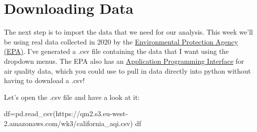 \documentclass[
  letterpaper,
  DIV=11,
  numbers=noendperiod]{scrreprt}
\newenvironment{Shaded}{\begin{snugshade}}{\end{snugshade}}
\newcommand{\NormalTok}[1]{\textcolor[rgb]{0.00,0.23,0.31}{#1}}
\newcommand{\OperatorTok}[1]{\textcolor[rgb]{0.37,0.37,0.37}{#1}}
\newcommand{\StringTok}[1]{\textcolor[rgb]{0.13,0.47,0.30}{#1}}
\begin{document}
\hypertarget{downloading-data-1}{%
\section{Downloading Data}\label{downloading-data-1}}

The next step is to import the data that we need for our analysis. This
week we'll be using real data collected in 2020 by the
\href{https://www.epa.gov/outdoor-air-quality-data/download-daily-data}{Environmental
Protection Agency (EPA)}. I've generated a .csv file containing the data
that I want using the dropdown menus. The EPA also has an
\href{https://aqs.epa.gov/aqsweb/documents/data_api.html}{Application
Programming Interface} for air quality data, which you could use to pull
in data directly into python without having to download a .csv!

Let's open the .csv file and have a look at it:

\begin{Shaded}
\begin{Highlighting}[]
\NormalTok{df}\OperatorTok{=}\NormalTok{pd.read\_csv(}\StringTok{\textquotesingle{}https://qm2.s3.eu{-}west{-}2.amazonaws.com/wk3/california\_aqi.csv\textquotesingle{}}\NormalTok{)}
\NormalTok{df}
\end{Highlighting}
\end{Shaded}
\end{document}
